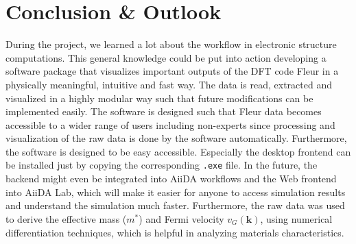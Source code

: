 
\chapter{Conclusion \& Outlook}
\label{chap:conclusion}

During the project, we learned a lot about the workflow in electronic structure
computations. This general knowledge could be put into action developing a software package that visualizes important outputs of the DFT code Fleur in a physically meaningful, intuitive and fast way. The data is read, extracted and visualized in a highly modular way such that future modifications can be implemented easily. 
The software is designed such that Fleur data becomes accessible to a wider range of users including non-experts since processing and visualization of the raw data is done by the software automatically. Furthermore, the software is designed to be easy accessible. Especially the desktop frontend can be installed just by copying the corresponding \texttt{.exe} file. In the future, the backend might even be integrated into AiiDA workflows and the Web frontend into AiiDA Lab, which will make it easier for anyone to access simulation results and understand the simulation much faster.
Furthermore, the raw data was used to derive the effective mass ($m^*$) and Fermi velocity $v_{G}(\mathbf{k})$, using numerical differentiation techniques, which is helpful in analyzing materials characteristics.



